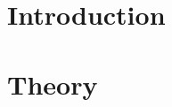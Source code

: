 \documentclass[main.tex]{subfiles}
\begin{document}
\chapter{Introduction}


\chapter{Theory}

\end{document}
